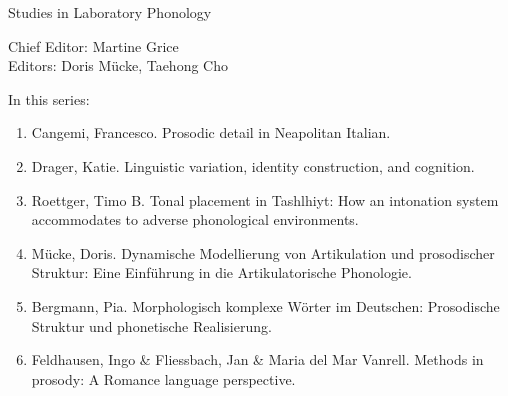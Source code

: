 
{\raggedleft{}}

\bigskip

{\large Studies in Laboratory Phonology}

\bigskip

Chief Editor:  Martine Grice%
\\
Editors:    Doris Mücke, %
    Taehong Cho %

\bigskip

In this series:

\begin{enumerate}
\item Cangemi, Francesco. Prosodic detail in Neapolitan Italian.
\item Drager, Katie. Linguistic variation, identity construction, and cognition.
\item Roettger, Timo B. Tonal placement in Tashlhiyt: How an intonation system accommodates to adverse phonological environments.
\item Mücke, Doris. Dynamische Modellierung von Artikulation und prosodischer Struktur: Eine Einführung in die Artikulatorische Phonologie.
\item Bergmann, Pia. Morphologisch komplexe Wörter im Deutschen: Prosodische Struktur und phonetische Realisierung. 
\item Feldhausen, Ingo \& Fliessbach, Jan \& Maria del Mar Vanrell. Methods in prosody: A Romance language perspective.
\end{enumerate}
